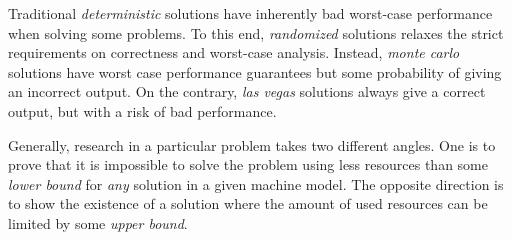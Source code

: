 Traditional \emph{deterministic} solutions have inherently bad worst-case performance when solving some problems. To this end, \emph{randomized} solutions relaxes the strict requirements on correctness and worst-case analysis. Instead, \emph{monte carlo} solutions have worst case performance guarantees but some probability of giving an incorrect output. On the contrary, \emph{las vegas} solutions always give a correct output, but with a risk of bad performance.

Generally, research in a particular problem takes two different angles. 
One is to prove that it is impossible to solve the problem using less resources than some \emph{lower bound} for \emph{any} solution in a given machine model. The opposite direction is to show the existence of a solution where the amount of used resources can be limited by some \emph{upper bound}. 

